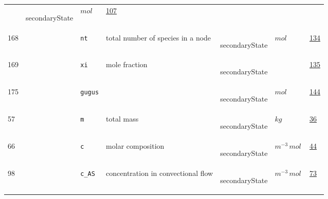 \begin{longtable}{|p{1cm}|p{2.5cm}|p{4.5cm}|p{8cm}|p{3.0cm}|p{3cm}|p{1cm}|}
             & \begin{lay}secondaryState \end{lay}
             & $ mol \, $
             &                 \hyperlink{"e:107"}{ 107 }
                 \\
        168
             & \hypertarget{"v:168"}{ $ {} $}
             & \verb|nt|
             & total number of species in a node
             & \begin{lay}secondaryState \end{lay}
             & $ mol \, $
             &                 \hyperlink{"e:134"}{ 134 }
                 \\
        169
             & \hypertarget{"v:169"}{ $ {} $}
             & \verb|xi|
             & mole fraction
             & \begin{lay}secondaryState \end{lay}
             & $  $
             &                 \hyperlink{"e:135"}{ 135 }
                 \\
        175
             & \hypertarget{"v:175"}{ $ {} $}
             & \verb|gugus|
             & 
             & \begin{lay}secondaryState \end{lay}
             & $ mol \, $
             &                 \hyperlink{"e:144"}{ 144 }
                 \\
        57
             & \hypertarget{"v:57"}{ $ {} $}
             & \verb|m|
             & total mass
             & \begin{lay}secondaryState \end{lay}
             & $ kg \, $
             &                 \hyperlink{"e:36"}{ 36 }
                 \\
        66
             & \hypertarget{"v:66"}{ $ {} $}
             & \verb|c|
             & molar composition
             & \begin{lay}secondaryState \end{lay}
             & $ m^{-3} \,mol \, $
             &                 \hyperlink{"e:44"}{ 44 }
                 \\
        98
             & \hypertarget{"v:98"}{ $ {} $}
             & \verb|c_AS|
             & concentration in convectional flow
             & \begin{lay}secondaryState \end{lay}
             & $ m^{-3} \,mol \, $
             &                 \hyperlink{"e:73"}{ 73 }
                 \\

\end{longtable}
